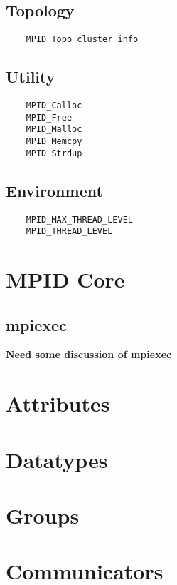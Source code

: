 \documentclass{article}
\begin{document}
\subsection{Topology}
\begin{verbatim}
    MPID_Topo_cluster_info
\end{verbatim}

\subsection{Utility}
\begin{verbatim}
    MPID_Calloc
    MPID_Free
    MPID_Malloc
    MPID_Memcpy
    MPID_Strdup
\end{verbatim}

\subsection{Environment}
\begin{verbatim}
    MPID_MAX_THREAD_LEVEL
    MPID_THREAD_LEVEL
\end{verbatim}

\section{MPID Core}



\subsection{mpiexec}
\textbf{Need some discussion of mpiexec}

\section{Attributes}




\section{Datatypes}




\section{Groups}



\section{Communicators}

\end{document}
